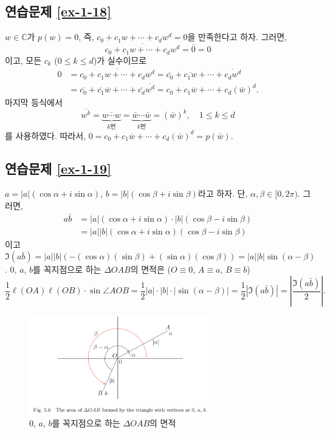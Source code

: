 \subsection*{연습문제 \ref{ex-1-18}}

$w\in\mathbb C$가 $p(w)=0$, 즉,
$c_0 + c_1w + \cdots + c_dw^d=0$을 만족한다고 하자. 
그러면,
\[
\overline{c_0 + c_1w + \cdots + c_dw^d} = \bar 0 = 0
\]
이고, 모든 $c_k$ ($0\le k\le d$)가 실수이므로
\begin{align*}
0 & = \overline{c_0 + c_1w + \cdots + c_dw^d} 
= \overline{c_0} + \overline{c_1w} + \cdots + \overline{c_dw^d} \\
&= \overline{c_0} + \overline{c_1}\overline{w} + \cdots + \overline{c_d}\overline{w^d}
= c_0 + c_1\overline{w} + \cdots + c_d(\bar w)^d.
\end{align*}
마지막 등식에서 
\[
\overline{w^k} = \underbrace{\overline{w\cdots w}}_{k\text{번}}
= \underbrace{\bar w \cdots \bar w}_{k\text{번}}
= (\bar w)^k,
\quad 1\le k \le d
\]
를 사용하였다.
따라서, $0=c_0 + c_1\overline{w} + \cdots + c_d(\bar w)^d = p(\bar w)$.

\subsection*{연습문제 \ref{ex-1-19}}

$a = |a|(\cos\alpha + i\sin\alpha)$, 
$b = |b|(\cos\beta + i\sin \beta)$라고 하자.
단, $\alpha, \beta \in [0,2\pi)$. 그러면,
\begin{align*}
a\bar b &= |a|(\cos\alpha + i\sin\alpha)\cdot
|b|(\cos\beta - i\sin \beta) \\
&=|a||b|(\cos\alpha + i\sin\alpha)(\cos\beta - i\sin \beta)
\end{align*}
이고 $\Im(a\bar b) = |a||b|(-(\cos\alpha)(\sin\beta) + (\sin\alpha)(\cos\beta))
= |a||b|\sin(\alpha-\beta)$.
$0$, $a$, $b$를 꼭지점으로 하는 $\Delta OAB$의 면적은
($O\equiv 0$, $A\equiv a$, $B\equiv b$)
\[
\dfrac12 \ell(OA)\ell(OB) \cdot \sin \angle AOB
= \dfrac12 |a|\cdot |b| \cdot |\sin(\alpha-\beta)|
= \dfrac12 |\Im(a\bar b)| = \left| \dfrac{\Im(a\bar b)}2\right|.
\]

\begin{figure}[h!]
\begin{center}
\includegraphics[width=0.7\textwidth]{./Solution/figs/fig-5-6}
\end{center}
\caption{$0$, $a$, $b$를 꼭지점으로 하는 $\Delta OAB$의 면적}
\label{fig-5-6}
\end{figure}

